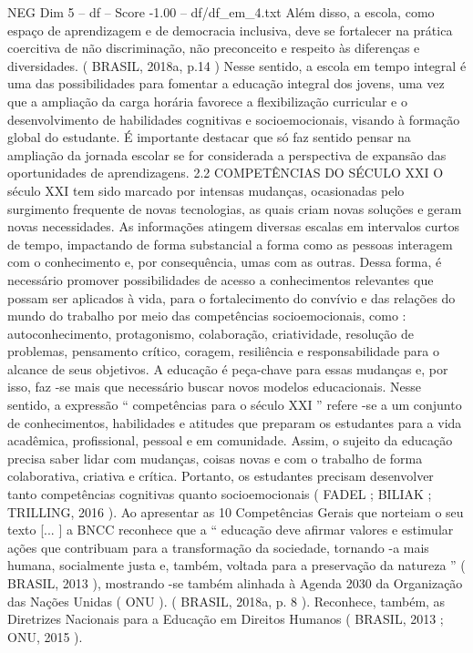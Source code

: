 \begin{textsample}{NEG Dim 5 – df – Score -1.00 – df/df\_em\_4.txt}
Além disso, a escola, como espaço de aprendizagem e de democracia inclusiva, deve se fortalecer na prática coercitiva de não discriminação, não preconceito e respeito às diferenças e diversidades. ( BRASIL, 2018a, p.14 ) Nesse sentido, a escola em tempo integral é uma das possibilidades para fomentar a educação integral dos jovens, uma vez que a ampliação da carga horária favorece a flexibilização curricular e o desenvolvimento de habilidades cognitivas e socioemocionais, visando à formação global do estudante.
É importante destacar que só faz sentido pensar na ampliação da jornada escolar se for considerada a perspectiva de expansão das oportunidades de aprendizagens. 2.2 COMPETÊNCIAS DO SÉCULO XXI O século XXI tem sido marcado por intensas mudanças, ocasionadas pelo surgimento frequente de novas tecnologias, as quais criam novas soluções e geram novas necessidades.
As informações atingem diversas escalas em intervalos curtos de tempo, impactando de forma substancial a forma como as pessoas interagem com o conhecimento e, por consequência, umas com as outras.
Dessa forma, é necessário promover possibilidades de acesso a conhecimentos relevantes que possam ser aplicados à vida, para o fortalecimento do convívio e das relações do mundo do trabalho por meio das competências socioemocionais, como : autoconhecimento, protagonismo, colaboração, criatividade, resolução de problemas, pensamento crítico, coragem, resiliência e responsabilidade para o alcance de seus objetivos.
A educação é peça-chave para essas mudanças e, por isso, faz -se mais que necessário buscar novos modelos educacionais.
Nesse sentido, a expressão “ competências para o século XXI ” refere -se a um conjunto de conhecimentos, habilidades e atitudes que preparam os estudantes para a vida acadêmica, profissional, pessoal e em comunidade.
Assim, o sujeito da educação precisa saber lidar com mudanças, coisas novas e com o trabalho de forma colaborativa, criativa e crítica.
Portanto, os estudantes precisam desenvolver tanto competências cognitivas quanto socioemocionais ( FADEL ; BILIAK ; TRILLING, 2016 ).
Ao apresentar as 10 Competências Gerais que norteiam o seu texto [... ] a BNCC reconhece que a “ educação deve afirmar valores e estimular ações que contribuam para a transformação da sociedade, tornando -a mais humana, socialmente justa e, também, voltada para a preservação da natureza ” ( BRASIL, 2013 ), mostrando -se também alinhada à Agenda 2030 da Organização das Nações Unidas ( ONU ). ( BRASIL, 2018a, p. 8 ).
Reconhece, também, as Diretrizes Nacionais para a Educação em Direitos Humanos ( BRASIL, 2013 ; ONU, 2015 ).

\end{textsample}
